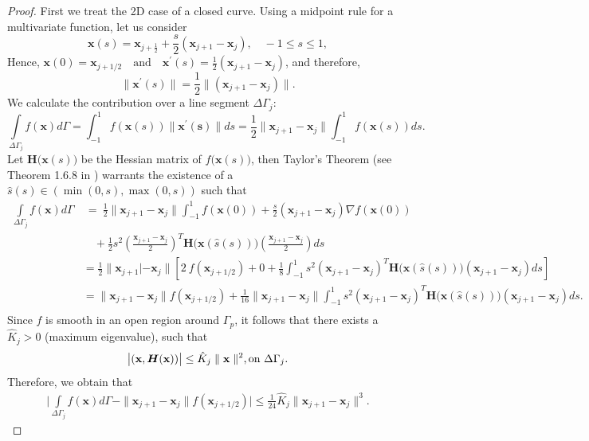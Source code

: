 \documentclass[pdflatex,sn-mathphys-num]{sn-jnl}
\newtheorem*{lemma star}{Lemma}
\begin{document}
\begin{proof}
First we treat the 2D case of a closed curve. Using a midpoint rule for a multivariate function, let us consider
\begin{equation*}
  \mathbf{x}(s)=\mathbf{x}_{j+\frac12}+\frac{s}{2}{(\mathbf{x}_{j+1}-\mathbf{x}_j)}, \quad -1 \leq s \leq 1,
\end{equation*}
Hence, $\mathbf{x}(0)=\mathbf{x}_{j+1/2}\quad\text{and}\quad{\mathbf{x}^{'}(s)}=\frac{1}{2}(\mathbf{x}_{j+1}-\mathbf{x}_j)$, and therefore,
\begin{equation*}
\parallel {\mathbf{x}^{'}(s)}\parallel=\frac{1}{2}\parallel(\mathbf{x}_{j+1}-\mathbf{x}_j)\parallel.
\end{equation*}
We calculate the contribution over a line segment $\Delta \Gamma_j$:
\[
\int\limits_{\Delta\Gamma_j} f(\mathbf{x}) d\Gamma = \int_{-1}^1 f(\mathbf{x}(s))\parallel\mathbf{x^{'}(s)}\parallel ds = \frac{1}{2}\parallel\mathbf{x}_{j+1} - \mathbf{x}_j\parallel \int_{-1}^1 f(\mathbf{x}(s)) ds.
\]
Let ${\boldsymbol{H}(\mathbf x}(s))$ be the Hessian matrix of $f\mathbf{(x}(s))$, then Taylor’s Theorem (see Theorem 1.6.8 in \citep{Vuik2023}) warrants the existence of a $\hat{s}(s)\in (\min(0,s),\max(0,s))$ such that
\begin{align*}
\int\limits_{\Delta\Gamma_j}f(\mathbf{x}) d\Gamma & ~=~ \frac{1}{2}\parallel\mathbf{x}_{j+1} - \mathbf{x}_j\parallel \int_{-1}^1 f(\mathbf{x}(0)) + \frac{s}{2}(\mathbf{x}_{j+1} - \mathbf{x}_j)\nabla f(\mathbf{x}(0)) \\
&\quad + \frac{1}{2}s^2 \left(\frac{\mathbf{x}_{j+1} - \mathbf{x}_j}{2} \right)^T {\boldsymbol{H}(\mathbf{x}}(\hat{s}(s)))(\frac{\mathbf{x}_{j+1} - \mathbf{x}_j}{2})ds \\
& =\frac{1}{2}\parallel\mathbf{x}_{j+1} | - \mathbf{x}_j\parallel \left[2 ~ f(\mathbf{x}_{j+1/2})+0 + \frac{1}{8} \int_{-1}^{1} s^2 (\mathbf{x}_{j+1} - \mathbf{x}_j)^T{\boldsymbol{H}(\mathbf{x}}(\hat{s}(s)))(\mathbf{x}_{j+1} - \mathbf{x}_j)ds\right]\\
&=\parallel\mathbf{x}_{j+1} - \mathbf{x}_j\parallel f(\mathbf{x}_{j+1/2})+ \frac{1}{16}\parallel\mathbf{x}_{j+1} - \mathbf{x}_j  \parallel \int_{-1}^1 s^2(\mathbf{x}_{j+1} - \mathbf{x}_j)^T{\boldsymbol{H}(\mathbf{x}}(\hat{s}(s)))(\mathbf{x}_{j+1} - \mathbf{x}_j)ds.\\
\end{align*}
Since $f$ is smooth in an open region around $\Gamma_p$, it follows that there exists a $\hat{K}_j>0$ (maximum eigenvalue), such that
\begin{equation*}
\big|{(\mathbf x,{\boldsymbol H}(\mathbf x))}\big|\leq \hat{K}_j\parallel\mathbf{x}\parallel^2,\\ \text{on } \Delta \Gamma_j.
\end{equation*}
Therefore, we obtain that
\begin{align*}
     \bigg|\int\limits_{\Delta\Gamma_j}f(\mathbf{x}) d\Gamma-\parallel\mathbf{x}_{j+1} - \mathbf{x}_j\parallel f(\mathbf{x}_{j+1/2})\bigg|\leq \frac{1}{24} \hat{K}_j \parallel\mathbf{x}_{j+1} - \mathbf{x}_j\parallel^3.
\end{align*}


\end{proof}
\end{document}
